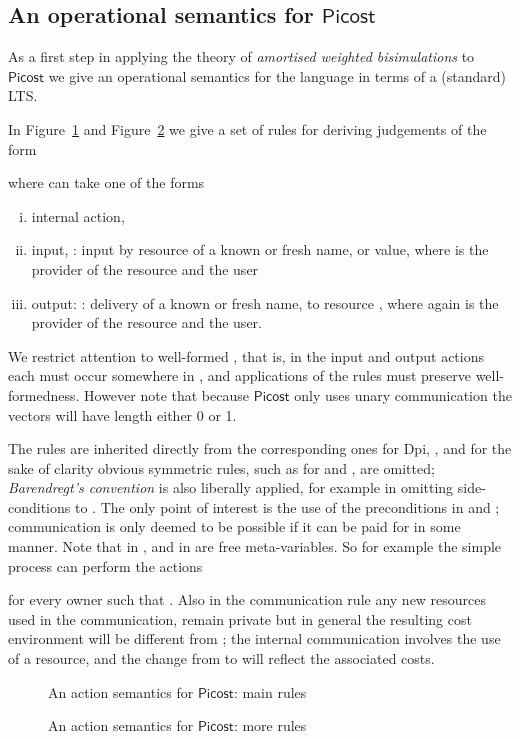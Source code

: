 \documentclass{LMCS}
\newcommand{\pfn}[1]{\mathsf{#1}}  \newcommand{\cfn}[1]{\mathsf{#1}}  \newcommand{\ownfnt}[1]{{\mathsf{#1}}}
\newcommand{\picost}{\ensuremath{\pfn{Picost}}\xspace}
\begin{document}
\subsection{An operational semantics for  \picost}

As a first step in applying the theory of \emph{amortised weighted bisimulations} to 
\picost we give an operational semantics for the language in terms of a 
(standard) LTS. 

In Figure~\ref{fig:lts} and Figure~\ref{fig:ltsB} we
give a set of rules for deriving judgements of the form
 
where  can take one of the forms 
\begin{enumerate}[(i)]
\item  internal action, 
\item input,  :  
input by resource  of  a known or fresh name, or value, where  is the provider
of the resource and  the user

\item output: : 
delivery of a known or fresh name, to resource , where again  
is the provider of the resource and  the user.


\end{enumerate}
We restrict attention to well-formed , that is, in the input and output actions
each  must occur somewhere in , and applications of the rules must preserve
well-formedness. 
However note that because \picost only uses unary communication the vectors 
 will have length either 0 or 1. 


The rules are inherited directly from the corresponding ones for Dpi,
\cite{dpibook}, and for the sake of clarity obvious symmetric rules, such as for 
 and , are omitted; \emph{Barendregt's convention}
is also liberally applied, for example in omitting side-conditions to
. The only point of interest is the use of the
preconditions  in 
and ; communication is only deemed to be possible if it can
be paid for in some manner. 
Note that  in , and
 in  are free meta-variables. So for example the
simple process  can perform the actions

for every owner  such that .
Also in the communication rule  any new resources used in the communication,
 remain private but in general the resulting cost environment  
will be different from ; the internal communication involves the use of a resource,
and the change from  to  will reflect the associated costs. 

\begin{figure}[t]

\caption{An action semantics  for \picost: main rules\label{fig:lts}}

\hrulefill

\end{figure}
\begin{figure}

\caption{An action semantics  for \picost: more rules\label{fig:ltsB}}

\hrulefill
\end{figure}
\end{document}
